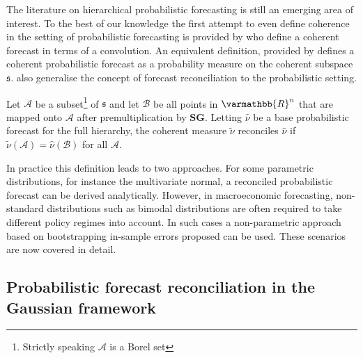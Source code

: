 \documentclass[graybox]{svmult}
\begin{document}
The literature on hierarchical probabilistic forecasting is still an emerging area of interest. %
To the best of our knowledge the first attempt to even define coherence in the setting of probabilistic forecasting is provided by \citet{Taieb2017} who define a coherent forecast in terms of a convolution. An equivalent definition, provided by \citet{GamEtAl2018} defines a coherent probabilistic forecast as a probability measure on the coherent subspace $\mathfrak{s}$. \citet{GamEtAl2018} also generalise the concept of forecast reconciliation to the probabilistic setting.

\begin{definition} Let $\mathcal{A}$ be a subset\footnote{Strictly speaking $\mathcal{A}$ is a Borel set} of $\mathfrak{s}$ and let $\mathcal{B}$ be all points in $\varmathbb{R}^n$ that are mapped onto $\mathcal{A}$ after premultiplication by $\bm{S}\bm{G}$. Letting $\hat{\nu}$ be a base probabilistic forecast for the full hierarchy, the coherent measure $\tilde{\nu}$ reconciles $\hat{\nu}$ if $\tilde{\nu}(\mathcal{A})=\hat{\nu}(\mathcal{B})$ for all $\mathcal{A}$.
\end{definition}

In practice this definition leads to two approaches. For some parametric distributions, for instance the multivariate normal, a reconciled probabilistic forecast can be derived analytically. However, in macroeconomic forecasting, non-standard distributions such as bimodal distributions are often required to take different policy regimes into account. In such cases a non-parametric approach based on bootstrapping in-sample errors proposed \citet{GamEtAl2018} can be used. These scenarios are now covered in detail.

\subsection{Probabilistic forecast reconciliation in the Gaussian framework}\label{sec:probrecgauss}

\end{document}
